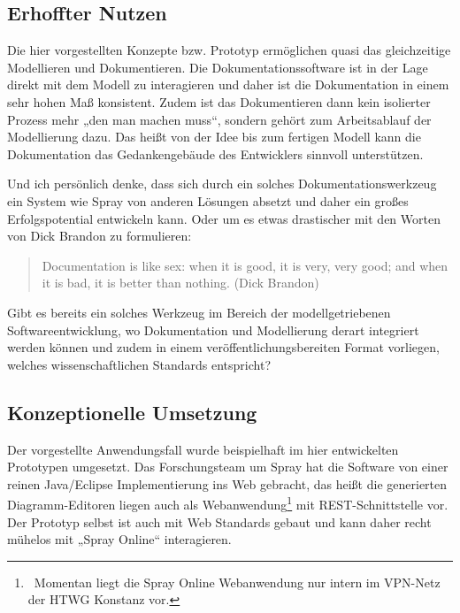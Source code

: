  
\subsection{Erhoffter Nutzen}\label{}
 
Die hier vorgestellten Konzepte bzw. Prototyp ermöglichen quasi das gleichzeitige Modellieren und Dokumentieren. Die Dokumentationssoftware ist in der Lage direkt mit dem Modell zu interagieren und daher ist die Dokumentation in einem sehr hohen Maß konsistent. Zudem ist das Dokumentieren dann kein isolierter Prozess mehr „den man machen muss“, sondern gehört zum Arbeitsablauf der Modellierung dazu. Das heißt von der Idee bis zum fertigen Modell kann die Dokumentation das Gedankengebäude des Entwicklers sinnvoll unterstützen.

 
Und ich persönlich denke, dass sich durch ein solches Dokumentationswerkzeug ein System wie Spray von anderen Lösungen absetzt und daher ein großes Erfolgspotential entwickeln kann. Oder um es etwas drastischer mit den Worten von Dick Brandon zu formulieren:

 
\begin{quote}
 Documentation is like sex: when it is good, it is very, very good; and when it is bad, it is better than nothing. (Dick Brandon)
\end{quote}
 
Gibt es bereits ein solches Werkzeug im Bereich der modellgetriebenen Softwareentwicklung, wo Dokumentation und Modellierung derart integriert werden können und zudem in einem veröffentlichungsbereiten Format vorliegen, welches wissenschaftlichen Standards entspricht?

 
\subsection{Konzeptionelle Umsetzung}\label{}
 
Der vorgestellte Anwendungsfall wurde beispielhaft im hier entwickelten Prototypen umgesetzt. Das Forschungsteam um Spray hat die Software von einer reinen Java/Eclipse Implementierung ins Web gebracht, das heißt die generierten Diagramm-Editoren liegen auch als Webanwendung\footnote{~Momentan liegt die Spray Online Webanwendung nur intern im VPN-Netz der HTWG Konstanz vor.} mit REST-Schnittstelle vor. Der Prototyp selbst ist auch mit Web Standards gebaut und kann daher recht mühelos mit „Spray Online“ interagieren.

